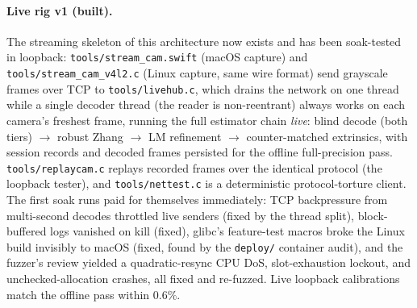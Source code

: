 \documentclass[11pt]{article}
\theoremstyle{definition}
\newcommand{\code}[1]{\texttt{#1}}
\begin{document}
\paragraph{Live rig v1 (built).} The streaming skeleton of this
architecture now exists and has been soak-tested in loopback:
\code{tools/stream\_cam.swift} (macOS capture) and
\code{tools/stream\_cam\_v4l2.c} (Linux capture, same wire format)
send grayscale frames over TCP to \code{tools/livehub.c}, which
drains the network on one thread while a single decoder thread (the
reader is non-reentrant) always works on each camera's freshest
frame, running the full estimator chain \emph{live}: blind decode
(both tiers) $\to$ robust Zhang $\to$ LM refinement $\to$
counter-matched extrinsics, with session records and decoded frames
persisted for the offline full-precision pass.
\code{tools/replaycam.c} replays recorded frames over the identical
protocol (the loopback tester), and \code{tools/nettest.c} is a
deterministic protocol-torture client. The first soak runs paid for
themselves immediately: TCP backpressure from multi-second decodes
throttled live senders (fixed by the thread split), block-buffered
logs vanished on kill (fixed), glibc's feature-test macros broke the
Linux build invisibly to macOS (fixed, found by the \code{deploy/}
container audit), and the fuzzer's review yielded a quadratic-resync
CPU DoS, slot-exhaustion lockout, and unchecked-allocation crashes,
all fixed and re-fuzzed. Live loopback calibrations match the
offline pass within $0.6\%$.
\label{sec:deployarch}
\end{document}

